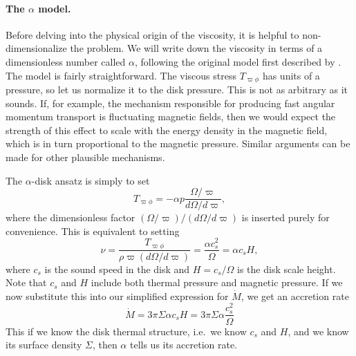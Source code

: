 \paragraph{The $\alpha$ model.}

Before delving into the physical origin of the viscosity, it is helpful to non-dimensionalize the problem. We will write down the viscosity in terms of a dimensionless number called $\alpha$, following the original model first described by \citet{shakura73a}. The model is fairly straightforward. The viscous stress  $T_{\varpi\phi}$ has units of a pressure, so let us normalize it to the disk pressure. This is not as arbitrary as it sounds. If, for example, the mechanism responsible for producing fast angular momentum transport is fluctuating magnetic fields, then we would expect the strength of this effect to scale with the energy density in the magnetic field, which is in turn proportional to the magnetic pressure. Similar arguments can be made for other plausible mechanisms.

The $\alpha$-disk ansatz is simply to set
\begin{equation}
T_{\varpi\phi} = -\alpha p \frac{\Omega/\varpi}{d\Omega/d\varpi},
\end{equation}
where the dimensionless factor $(\Omega/\varpi)/(d\Omega/d\varpi)$ is inserted purely for convenience. This is equivalent to setting
\begin{equation}
\nu = \frac{T_{\varpi\phi}}{\rho \varpi (d\Omega/d\varpi)} = \frac{\alpha c_s^2}{\Omega} = \alpha c_s H,
\end{equation}
where $c_s$ is the sound speed in the disk and $H = c_s/\Omega$ is the disk scale height. Note that $c_s$ and $H$ include both thermal pressure and magnetic pressure. If we now substitute this into our simplified expression for $\dot{M}$, we get an accretion rate
\begin{equation}
\label{eq:mdot_steady}
\dot{M} = 3\pi \Sigma \alpha c_s H = 3\pi \Sigma \alpha \frac{c_s^2}{\Omega}
\end{equation}
This if we know the disk thermal structure, i.e.\ we know $c_s$ and $H$, and we know its surface density $\Sigma$, then $\alpha$ tells us its accretion rate.

